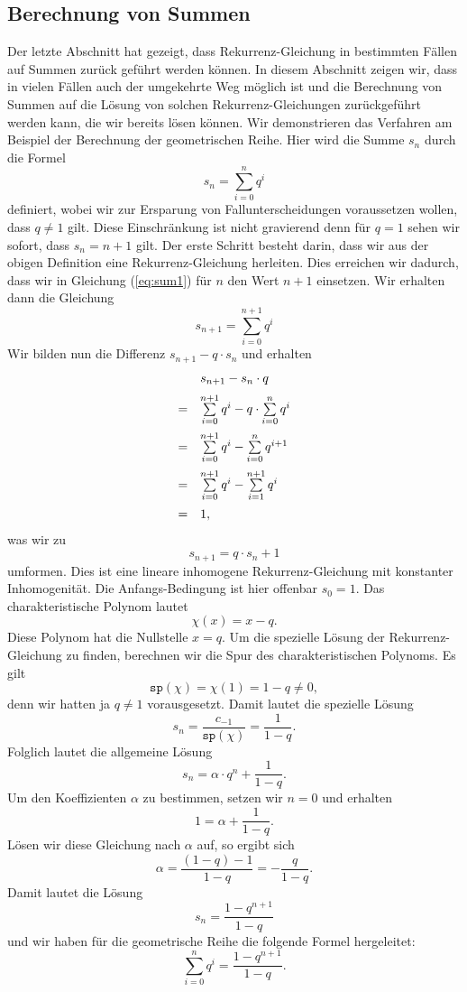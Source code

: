 \subsection{Berechnung von Summen}
Der letzte Abschnitt hat gezeigt, dass Rekurrenz-Gleichung in bestimmten Fällen auf Summen zurück geführt
werden können.  In diesem Abschnitt zeigen wir, dass in vielen Fällen auch der umgekehrte
Weg möglich ist und die   Berechnung von Summen auf die Lösung von solchen
Rekurrenz-Gleichungen zurückgeführt werden 
kann, die wir bereits lösen können.  
Wir demonstrieren das Verfahren am Beispiel der Berechnung der geometrischen Reihe.  Hier wird die Summe
$s_n$ durch die Formel
\begin{equation}
  \label{eq:sum1}
  s_n = \sum\limits_{i=0}^n q^i   
\end{equation}
definiert, wobei wir zur Ersparung von Fallunterscheidungen voraussetzen wollen, dass $q \not= 1$ gilt.
Diese Einschränkung ist nicht gravierend denn für $q=1$ sehen wir sofort, dass $s_n = n+1$ gilt. Der
erste Schritt besteht darin, dass wir aus der obigen Definition eine Rekurrenz-Gleichung herleiten.
Dies erreichen wir dadurch, dass wir in Gleichung (\ref{eq:sum1}) für $n$ den Wert $n+1$ einsetzen.  Wir
erhalten dann die Gleichung
\begin{equation}
  \label{eq:sum2}
  s_{n+1} = \sum\limits_{i=0}^{n+1} q^i    
\end{equation}
Wir bilden nun die Differenz  $s_{n+1} - q \cdot s_n$ und erhalten
\[ 
\begin{array}[t]{cl}
    & s_{n+1} - s_n \cdot q                                            \\[0.2cm]
  = & \sum\limits_{i=0}^{n+1} q^i - q \cdot \sum\limits_{i=0}^{n} q^i  \\[0.4cm]
  = & \sum\limits_{i=0}^{n+1} q^i -  \sum\limits_{i=0}^{n} q^{i+1}     \\[0.4cm]
  = & \sum\limits_{i=0}^{n+1} q^i -  \sum\limits_{i=1}^{n+1} q^{i}     \\[0.4cm]
  = & 1, 
\end{array}
\]
was wir zu
\[ s_{n+1} = q \cdot s_n + 1 \]
umformen.  Dies ist eine lineare inhomogene Rekurrenz-Gleichung mit konstanter Inhomogenität. 
Die Anfangs-Bedingung ist hier offenbar $s_0 = 1$.  Das charakteristische Polynom lautet
\[ \chi(x) = x - q. \]
Diese Polynom hat die Nullstelle $x = q$.  Um die spezielle Lösung der Rekurrenz-Gleichung zu finden,
berechnen wir die Spur des charakteristischen Polynoms.  Es gilt
\[ \mathtt{sp}(\chi) = \chi(1) = 1 - q \not= 0, \]  
denn wir hatten ja $q \not= 1$ vorausgesetzt.  Damit lautet die spezielle Lösung
\[ s_n = \frac{c_{-1}}{\mathtt{sp}(\chi)} = \frac{1}{1 - q}. \]
Folglich lautet die allgemeine Lösung
\[ s_n = \alpha \cdot q^n + \frac{1}{1 - q}.  \]
Um den Koeffizienten $\alpha$ zu bestimmen, setzen wir $n=0$ und erhalten
\[ 1 = \alpha + \frac{1}{1 - q}. \]
Lösen wir diese Gleichung nach $\alpha$ auf, so ergibt sich
\[ \alpha = \frac{(1 - q) - 1}{1 - q} = - \frac{q}{1 - q}. \]
Damit lautet die Lösung
\[ s_n = \frac{1 - q^{n+1}}{1 - q} \]
und wir haben für die geometrische Reihe die folgende Formel hergeleitet:
\[ \sum\limits_{i=0}^{n} q^i = \frac{1 - q^{n+1}}{1 - q}. \]
\pagebreak


